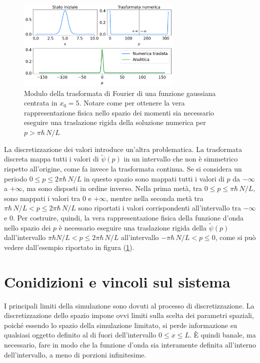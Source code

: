 \begin{figure}
    \centering
    \includegraphics[width = 0.7\textwidth]{immagini/fourier.png}
    \caption{Modulo della trasformata di Fourier di una funzione gaussiana centrata in $x_0 = 5$. Notare come per ottenere la vera rappresentazione fisica nello spazio dei momenti sia necessario eseguire una traslazione rigida della soluzione numerica per $p >   \pi \hbar \, N / L  $}
    \label{fig:dft_shift}
\end{figure}
La discretizzazione dei valori introduce un'altra problematica. La trasformata discreta mappa tutti i valori di $\tilde{\psi}(p)$ in un intervallo che non è simmetrico rispetto all'origine, come fa invece la trasformata continua. Se si considera un periodo $ 0 \le p \le 2 \pi \hbar \, N / L  $ in questo spazio sono mappati tutti i valori di $p$ da $- \infty$ a $+ \infty$, ma sono disposti in ordine inverso. Nella prima metà, tra $ 0 \le p \le \pi \hbar \, N / L  $, sono mappati i valori tra $0$ e $+ \infty$, mentre nella seconda metà tra  $ \pi \hbar \, N / L  < p \le 2 \pi \hbar \, N / L $ sono riportati i valori corrispondenti all'intervallo tra $- \infty$ e $0$. Per costruire, quindi, la vera rappresentazione fisica della funzione d'onda nello spazio dei $p$ è necessario eseguire una traslazione rigida della $\tilde{\psi}(p)$ dall'intervallo $ \pi \hbar N / L < p \le 2 \pi \hbar \, N / L $ all'intervallo $ - \pi \hbar \, N / L  < p \le 0 $, come si può vedere dall'esempio riportato in figura (\ref{fig:dft_shift}).


\section{Conidizioni e vincoli sul sistema} %
\label{sec:limits}

I principali limiti della simulazione sono dovuti al processo di discretizzazione. 
La discretizzazione dello spazio impone ovvi limiti sulla scelta dei parametri spaziali, poiché essendo lo spazio della simulazione limitato, si perde informazione su qualsiasi oggetto definito al di fuori dell'intervallo $ 0 \le x \le L$. È quindi banale, ma necessario, fare in modo che la funzione d'onda sia interamente definita all'interno dell'intervallo, a meno di porzioni infinitesime. 


